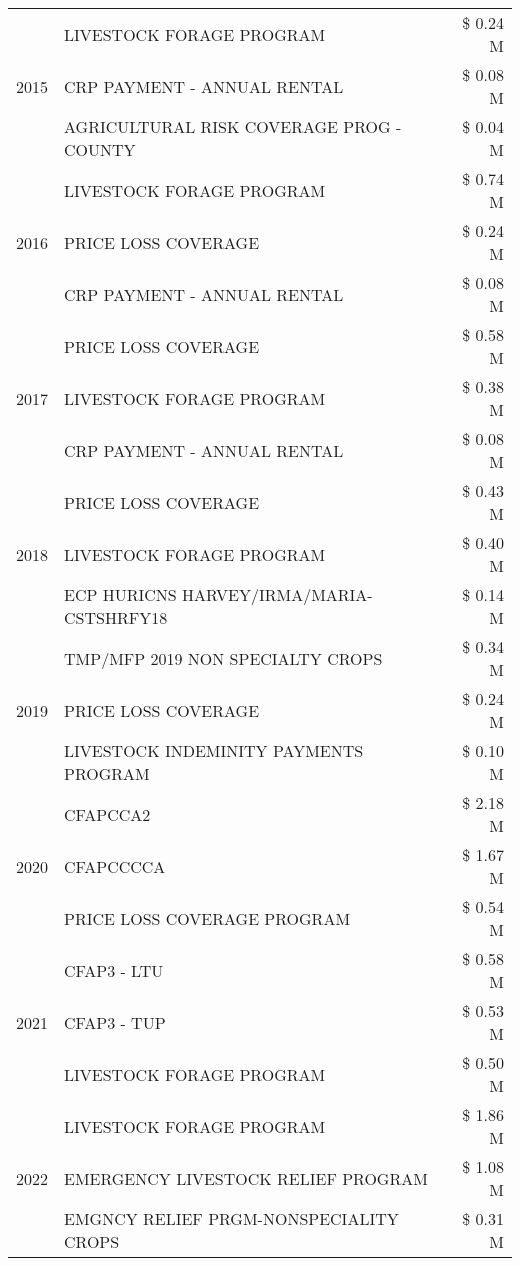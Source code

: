 \begin{tabular}{llr}
\cline{1-3}
\multirow[t]{3}{*}{2015} & LIVESTOCK FORAGE PROGRAM & \$ 0.24 M \\
 & CRP PAYMENT - ANNUAL RENTAL & \$ 0.08 M \\
 & AGRICULTURAL RISK COVERAGE PROG - COUNTY & \$ 0.04 M \\
\cline{1-3}
\multirow[t]{3}{*}{2016} & LIVESTOCK FORAGE PROGRAM & \$ 0.74 M \\
 & PRICE LOSS COVERAGE & \$ 0.24 M \\
 & CRP PAYMENT - ANNUAL RENTAL & \$ 0.08 M \\
\cline{1-3}
\multirow[t]{3}{*}{2017} & PRICE LOSS COVERAGE & \$ 0.58 M \\
 & LIVESTOCK FORAGE PROGRAM & \$ 0.38 M \\
 & CRP PAYMENT - ANNUAL RENTAL & \$ 0.08 M \\
\cline{1-3}
\multirow[t]{3}{*}{2018} & PRICE LOSS COVERAGE & \$ 0.43 M \\
 & LIVESTOCK FORAGE PROGRAM & \$ 0.40 M \\
 & ECP HURICNS HARVEY/IRMA/MARIA-CSTSHRFY18 & \$ 0.14 M \\
\cline{1-3}
\multirow[t]{3}{*}{2019} & TMP/MFP 2019 NON SPECIALTY CROPS & \$ 0.34 M \\
 & PRICE LOSS COVERAGE & \$ 0.24 M \\
 & LIVESTOCK INDEMINITY PAYMENTS PROGRAM & \$ 0.10 M \\
\cline{1-3}
\multirow[t]{3}{*}{2020} & CFAPCCA2 & \$ 2.18 M \\
 & CFAPCCCCA & \$ 1.67 M \\
 & PRICE LOSS COVERAGE PROGRAM & \$ 0.54 M \\
\cline{1-3}
\multirow[t]{3}{*}{2021} & CFAP3 - LTU & \$ 0.58 M \\
 & CFAP3 - TUP & \$ 0.53 M \\
 & LIVESTOCK FORAGE PROGRAM & \$ 0.50 M \\
\cline{1-3}
\multirow[t]{3}{*}{2022} & LIVESTOCK FORAGE PROGRAM & \$ 1.86 M \\
 & EMERGENCY LIVESTOCK RELIEF PROGRAM & \$ 1.08 M \\
 & EMGNCY RELIEF PRGM-NONSPECIALITY CROPS & \$ 0.31 M \\
\cline{1-3}
\bottomrule
\end{tabular}
